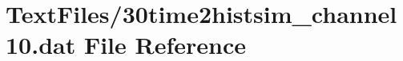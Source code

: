 \hypertarget{30time2histsim__channel10_8dat}{}\section{Text\+Files/30time2histsim\+\_\+channel10.dat File Reference}
\label{30time2histsim__channel10_8dat}
